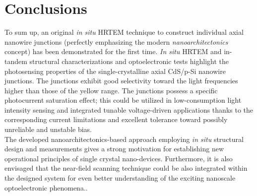 \section{Conclusions}
To sum up, an original {\em in situ} HRTEM technique to construct individual axial nanowire junctions (perfectly emphasizing the modern {\em nanoarchitectonics} concept) has been demonstrated for the first time. 
{\em In situ} HRTEM and in-tandem structural characterizations and optoelectronic tests highlight the photosensing properties of the single-crystalline axial CdS/p-Si nanowire junctions. The junctions exhibit good selectivity toward the light frequencies higher than those of the yellow range. The junctions possess a specific photocurrent saturation effect; this could be utilized in low-consumption light intensity sensing and integrated tunable voltage-driven applications thanks to the corresponding current limitations and excellent tolerance toward possibly unreliable and unstable bias. \\
The developed nanoarchitectonics-based approach employing \textit{in situ} structural design and measurements gives a strong motivation for establishing new operational principles of single crystal nano-devices. 
Furthermore, it is also envisaged that the near-field scanning technique could be also integrated within the designed system for even better understanding of the exciting nanoscale optoelectronic phenomena.\cite{Gu2005,Xiang2012}.



